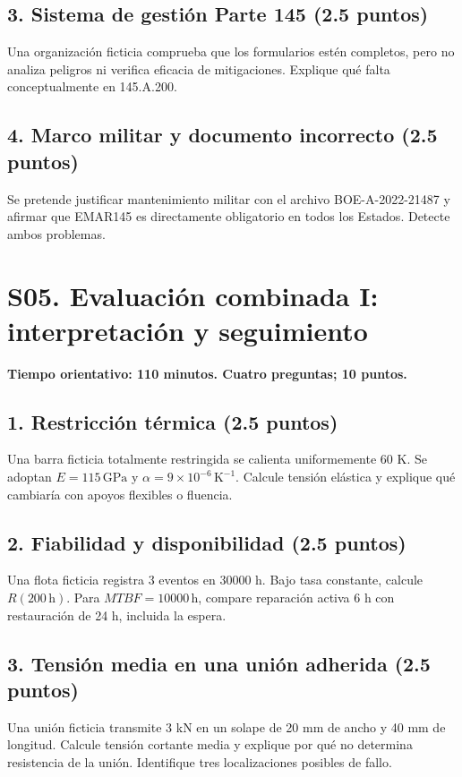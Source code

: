 \section*{3. Sistema de gestión Parte 145 (2.5 puntos)}
Una organización ficticia comprueba que los formularios estén completos, pero no analiza peligros ni verifica eficacia de mitigaciones. Explique qué falta conceptualmente en 145.A.200.

\section*{4. Marco militar y documento incorrecto (2.5 puntos)}
Se pretende justificar mantenimiento militar con el archivo BOE-A-2022-21487 y afirmar que EMAR145 es directamente obligatorio en todos los Estados. Detecte ambos problemas.

\chapter{S05. Evaluación combinada I: interpretación y seguimiento}
\noindent\textbf{Tiempo orientativo: 110 minutos. Cuatro preguntas; 10 puntos.}
\section*{1. Restricción térmica (2.5 puntos)}
Una barra ficticia totalmente restringida se calienta uniformemente 60 K. Se adoptan $E=115\,\mathrm{GPa}$ y $\alpha=9\times10^{-6}\,\mathrm{K^{-1}}$. Calcule tensión elástica y explique qué cambiaría con apoyos flexibles o fluencia.

\section*{2. Fiabilidad y disponibilidad (2.5 puntos)}
Una flota ficticia registra 3 eventos en 30000 h. Bajo tasa constante, calcule $R(200\,\mathrm h)$. Para $MTBF=10000\,\mathrm h $, compare reparación activa 6 h con restauración de 24 h, incluida la espera.

\section*{3. Tensión media en una unión adherida (2.5 puntos)}
Una unión ficticia transmite 3 kN en un solape de 20 mm de ancho y 40 mm de longitud. Calcule tensión cortante media y explique por qué no determina resistencia de la unión. Identifique tres localizaciones posibles de fallo.

